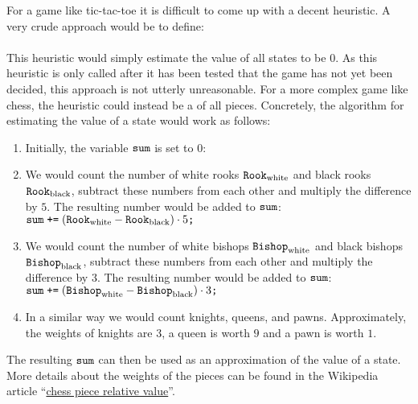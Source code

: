 For a game like tic-tac-toe it is difficult to come up with a decent heuristic.  A very crude approach would be
to define:
\\[0.2cm]
\hspace*{1.3cm}
\\[0.2cm]
This heuristic would simply estimate the value of all states to be $0$.  As this heuristic is only called after
it has been tested that the game has not yet been decided, this approach is not utterly unreasonable.  For a more
complex game like chess, the heuristic could instead be a  of all pieces.  Concretely, the
algorithm for estimating the value of a state would work as follows:
\begin{enumerate}
\item Initially, the variable $\texttt{sum}$ is set to $0$:
      \\[0.2cm]
      \hspace*{1.3cm}
\item We would count the number of white rooks $\texttt{Rook}_{\mathrm{white}}$ and black rooks $\texttt{Rook}_{\mathrm{black}}$,
      subtract these numbers from each other and multiply the difference by $5$.  
      The resulting number would be added to $\texttt{sum}$:
      \\[0.2cm]
      \hspace*{1.3cm}
      $\texttt{sum} \;\texttt{+=}\; (\texttt{Rook}_{\mathrm{white}} - \texttt{Rook}_{\mathrm{black}}) \cdot 5\texttt{;}$
\item We would count the number of white bishops $\texttt{Bishop}_{\mathrm{white}}$ and black bishops
      $\texttt{Bishop}_{\mathrm{black}}$,
      subtract these numbers from each other and multiply the difference by $3$.  
      The resulting number would be added to $\texttt{sum}$:
      \\[0.2cm]
      \hspace*{1.3cm}
      $\texttt{sum} \;\texttt{+=}\; (\texttt{Bishop}_{\mathrm{white}} - \texttt{Bishop}_{\mathrm{black}}) \cdot 3\texttt{;}$
\item In a similar way we would count knights, queens, and pawns.  Approximately, the weights of
      knights are $3$, a queen is worth $9$ and a pawn is worth $1$.
\end{enumerate}
The resulting $\texttt{sum}$ can then be used as an approximation of the value of a state.
More details about the weights of the pieces can be found in the Wikipedia article 
``\href{https://en.wikipedia.org/wiki/Chess_piece_relative_value}{chess piece relative value}''.

